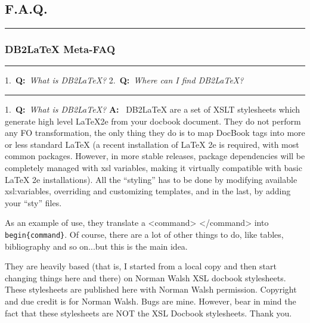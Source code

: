 \documentclass[pdftex,english,a4paper,10pt]{article}
\makeatletter
\def\docbooktolatexgobble{\expandafter\@gobble}
\makeatother
\begin{document}
\subsection*{F.A.Q.}
\label{id2733268}
\noindent\begin{minipage}{\linewidth}
\vspace{0.25em}\hrule\vspace{0.25em}
\subsubsection*{DB2LaTeX Meta-FAQ}\label{id2733271}
\hrule\vspace{0.25em}
\end{minipage}
\noindent{}1.~\textbf{Q:}~\textit{What is DB2LaTeX?}
\newline
\noindent{}2.~\textbf{Q:}~\textit{Where can I find DB2LaTeX?}
\vspace{0.25em}\hrule
\vspace{1em}
\noindent{}1.~\textbf{Q:}~\textit{What is DB2LaTeX?}
\newline
\noindent\textbf{A:}~
DB2LaTeX are a set of XSLT stylesheets which generate high level LaTeX2e from your docbook document. They do not perform any FO transformation, the only thing they do is to map DocBook tags into more or less standard LaTeX (a recent installation of LaTeX 2e is required, with most common packages. However, in more stable releases, package dependencies will be completely managed with xsl variables, making it virtually compatible with basic LaTeX 2e installations). All the {``}styling{''} has to be done by modifying available xsl:variables, overriding and customizing templates, and in the last, by adding your {``}sty{''} files.

As an example of use, they translate a \textless{}command\textgreater{} \textless{}/command\textgreater{} into {\texttt{{\docbooktolatexgobble\string\\begin\docbooktolatexgobble\string\{command\docbooktolatexgobble\string\}}}}. Of course, there are a lot of other things to do, like tables, bibliography and so on...but this is the main idea.

They are heavily based (that is, I started from a local copy and then start changing things here and there) on Norman Walsh XSL docbook stylesheets. These stylesheets are published here with Norman Walsh permission. Copyright and due credit is for Norman Walsh. Bugs are mine. However, bear in mind the fact that these stylesheets are NOT the XSL Docbook stylesheets. Thank you.
\end{document}

